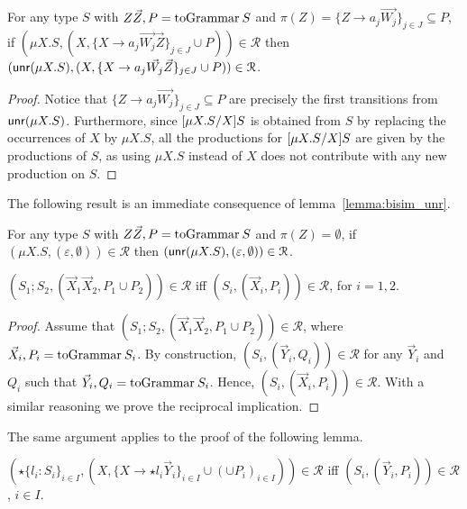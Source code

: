 \begin{lemma}
  \label{lemma:bisim_unr}
  For any type $S$ with $Z\vec Z, P = \toGrammarf{S}$
  and $\pi(Z) = \{Z \rightarrow a_j \vec {W_j}\}_{j\in J}\subseteq P$, if
  $(\mu X.S, (X, \{X \rightarrow a_j \vec {W_j}\vec Z\}_{j\in J} \cup
  P))\in \mathcal{R}$ then
  $(\mathsf{unr}(\mu X.S), (X, \{X \rightarrow a_j \vec {W_j}\vec
  Z\}_{j\in J} \cup P)) \in \mathcal{R}$.
\end{lemma}

\begin{proof}
	Notice that $\{Z \rightarrow a_j \vec {W_j}\}_{j\in J}\subseteq P$ are 
	precisely the first 
	transitions from $\mathsf{unr}(\mu X.S)$. Furthermore, since 
	$[{\mu X.S}/{X}] S$ is obtained from $S$ by 
	replacing the occurrences of $X$ by $\mu X.S$, all the productions for
	$[{\mu X.S}/{X}] S$ 
	are given by the productions of $S$, as using $\mu X.S$
	instead of $X$ does not contribute with any new production on $S$.
\end{proof}

The following result is an immediate consequence of lemma~\ref{lemma:bisim_unr}.
\begin{corollary}
\label{corol:bisim_unr}
	For any type $S$ with $Z\vec Z, P = \toGrammarf{S}$ and $\pi(Z) =\emptyset$,
	if  $(\mu X.S, (\varepsilon, \emptyset))\in \mathcal{R}$ then
  $(\mathsf{unr}(\mu X.S), (\varepsilon, \emptyset)) \in \mathcal{R}$.
\end{corollary}


\begin{lemma}
\label{lemma:bisim_semi}
	$(S_1;S_2, (\vec X_1\vec X_2,  P_1 \cup  P_2))\in\mathcal{R}$ iff 
	$(S_i, (\vec X_i,  P_i))\in\mathcal{R}$, for $i=1,2$.
\end{lemma}
\begin{proof}
	Assume that $(S_1;S_2, (\vec X_1\vec X_2,  P_1 \cup  P_2))\in\mathcal{R}$,
	where $ \vec X_i, P_i = \toGrammarf{S_i}$.
	By construction, $(S_i, (\vec Y_i,  Q_i))\in\mathcal{R}$ for any
	$\vec Y_i$ and $Q_i$ such that $ \vec Y_i, Q_i = \toGrammarf{S_i}$.
	Hence, $(S_i, (\vec X_i,  P_i))\in\mathcal{R}$. With a similar reasoning 
	we prove the reciprocal implication.
\end{proof}

The same argument applies to the proof of the following lemma.

\begin{lemma}
\label{lemma:bisim_choice}
	$(\star\{l_i\colon S_i\}_{i\in I}, (X, \{X \rightarrow \star l_i
    \vec Y_i\}_{i\in I} \cup (\cup  P_i)_{i\in I}))\in\mathcal{R}$ iff 
	$(S_i, (\vec Y_i,  P_i))\in\mathcal{R}$, $i \in I$.
\end{lemma}

